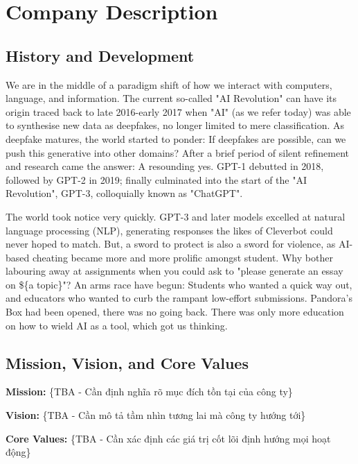 \def\code#1{\texttt{#1}}

\section{Company Description}

\subsection{History and Development}
We are in the middle of a paradigm shift of how we interact with computers, language, and
 information. The current so-called "AI Revolution" can have its origin traced back to late 2016-early 2017 when "AI"
 (as we refer today) was able to synthesise new data as deepfakes, no longer limited to mere classification. As
 deepfake matures, the world started to ponder: If deepfakes are possible, can we push this generative into other
 domains? After a brief period of silent refinement and research came the answer: A resounding yes. GPT-1 debutted in
 2018, followed by GPT-2 in 2019; finally culminated into the start of the "AI Revolution", GPT-3, colloquially known
 as "ChatGPT".

The world took notice very quickly. GPT-3 and later models excelled at natural language processing (NLP), generating
responses the likes of Cleverbot could never hoped to match. But, a sword to protect is also a sword for violence, as
AI-based cheating became more and more prolific amongst student. Why bother labouring away at assignments when you
could ask to "please generate an essay on \$\{a topic\}"? An arms race have begun: Students who wanted a quick way out,
and educators who wanted to curb the rampant low-effort submissions. Pandora's Box had been opened, there was no going
back. There was only more education on how to wield AI as a tool, which got us thinking.

\subsection{Mission, Vision, and Core Values}
\textbf{Mission:} \{TBA - Cần định nghĩa rõ mục đích tồn tại của công ty\}

\textbf{Vision:} \{TBA - Cần mô tả tầm nhìn tương lai mà công ty hướng tới\}

\textbf{Core Values:} \{TBA - Cần xác định các giá trị cốt lõi định hướng mọi hoạt động\}

